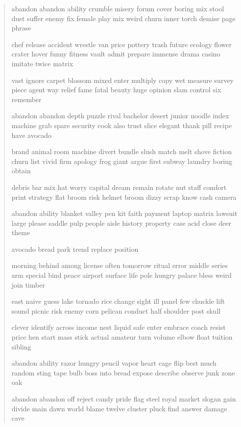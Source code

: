 \documentclass[a5paper, twoside]{book}
\begin{document}
\begin{verse}
 abandon abandon ability crumble misery forum cover boring mix stool dust suffer enemy fix female play mix weird churn inner torch demise page phrase

 chef release accident wrestle van price pottery trash future ecology flower crater hover funny fitness vault admit prepare immense drama casino imitate twice matrix

 vast ignore carpet blossom mixed enter multiply copy wet measure survey piece agent way relief fame fatal beauty huge opinion slam control six remember

 abandon abandon depth puzzle rival bachelor desert junior noodle index machine grab spare security cook also trust slice elegant thank pill recipe have avocado

 brand animal room machine divert bundle slush match melt shove fiction churn list vivid firm apology frog giant argue first subway laundry boring obtain

 debris bar mix hat worry capital dream remain rotate nut staff comfort print strategy flat broom risk helmet broom dizzy scrap know cash camera

 abandon ability blanket valley pen kit faith payment laptop matrix lawsuit large please saddle pulp people aisle history property case acid close deer theme

 avocado bread park trend replace position

 morning behind among license often tomorrow ritual error middle series arm special bind peace airport surface life pole hungry palace bless weird join timber

 east naive guess lake tornado rice change sight ill panel few chuckle lift sound picnic risk enemy corn pelican conduct half shoulder post skull

 clever identify across income nest liquid safe enter embrace coach resist price hen start mass stick actual amateur turn volume elbow float tuition sibling

 abandon ability razor hungry pencil vapor heart cage flip best much random sting tape bulb boss into bread expose describe observe junk zone oak

 abandon abandon off reject candy pride flag steel royal market slogan gain divide main dawn world blame twelve cluster pluck find answer damage cave


\end{verse}
\end{document}
